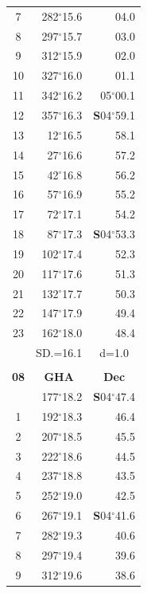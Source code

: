 \documentclass[10pt, a4paper]{report}
\begin{document}
\begin{scriptsize}
\begin{tabular*}{0.2\textwidth}[t]{@{\extracolsep{\fill}}|c|rr|}
7 & 282$^\circ$15.6 & 04.0\\
8 & 297$^\circ$15.7 & 03.0\\
9 & 312$^\circ$15.9 & \raisebox{0.24ex}{\boldmath$\cdot$~\boldmath$\cdot$~~}02.0\\
10 & 327$^\circ$16.0 & 01.1\\
11 & 342$^\circ$16.2 & 05$^\circ$00.1\\[2Pt]
12 & 357$^\circ$16.3 & \textbf{S}04$^\circ$59.1\\
13 & 12$^\circ$16.5 & 58.1\\
14 & 27$^\circ$16.6 & 57.2\\
15 & 42$^\circ$16.8 & \raisebox{0.24ex}{\boldmath$\cdot$~\boldmath$\cdot$~~}56.2\\
16 & 57$^\circ$16.9 & 55.2\\
17 & 72$^\circ$17.1 & 54.2\\[2Pt]
18 & 87$^\circ$17.3 & \textbf{S}04$^\circ$53.3\\
19 & 102$^\circ$17.4 & 52.3\\
20 & 117$^\circ$17.6 & 51.3\\
21 & 132$^\circ$17.7 & \raisebox{0.24ex}{\boldmath$\cdot$~\boldmath$\cdot$~~}50.3\\
22 & 147$^\circ$17.9 & 49.4\\
23 & 162$^\circ$18.0 & 48.4\\
\hline
\rule{0pt}{2.4ex} & \multicolumn{1}{c}{SD.=16.1} & \multicolumn{1}{c|}{d=1.0}\\
\hline
\multicolumn{1}{c}{}\\[-0.5ex]\hline
\multicolumn{1}{|c|}{\rule{0pt}{2.6ex}\textbf{08}} & \multicolumn{1}{c}{\textbf{GHA}} & \multicolumn{1}{c|}{\textbf{Dec}}\\
\hline\rule{0pt}{2.6ex}\noindent
0 & 177$^\circ$18.2 & \textbf{S}04$^\circ$47.4\\
1 & 192$^\circ$18.3 & 46.4\\
2 & 207$^\circ$18.5 & 45.5\\
3 & 222$^\circ$18.6 & \raisebox{0.24ex}{\boldmath$\cdot$~\boldmath$\cdot$~~}44.5\\
4 & 237$^\circ$18.8 & 43.5\\
5 & 252$^\circ$19.0 & 42.5\\[2Pt]
6 & 267$^\circ$19.1 & \textbf{S}04$^\circ$41.6\\
7 & 282$^\circ$19.3 & 40.6\\
8 & 297$^\circ$19.4 & 39.6\\
9 & 312$^\circ$19.6 & \raisebox{0.24ex}{\boldmath$\cdot$~\boldmath$\cdot$~~}38.6\\

\end{tabular*}
\end{scriptsize}
\end{document}
